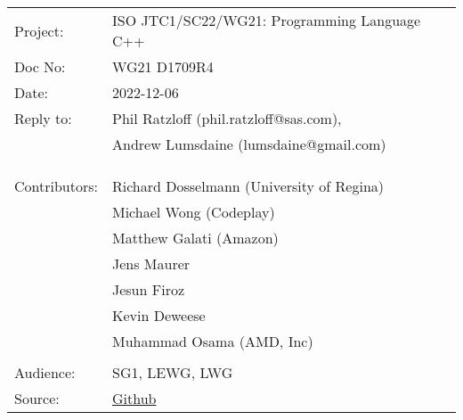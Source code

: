 \documentclass[10pt,oneside,openany,final]{memoir}
\begin{document}
\pagestyle{cpppage}


\begin{tabular}{@{}ll}
  Project:      & ISO JTC1/SC22/WG21: Programming Language C++           \\
  Doc No:       & WG21 D1709R4                                           \\
  Date:         & 2022-12-06                                             \\
  Reply to:     & Phil Ratzloff (phil.ratzloff@sas.com),                 \\
                & Andrew Lumsdaine (lumsdaine@gmail.com)                 \\
                &                                                        \\
                &                                                        \\
                &                                                        \\
  Contributors: & Richard Dosselmann (University of Regina)              \\
                & Michael Wong (Codeplay)                                \\
                & Matthew Galati (Amazon)                                \\
                & Jens Maurer                                            \\
                & Jesun Firoz                                            \\
                & Kevin Deweese                                          \\
                & Muhammad Osama (AMD, Inc)                              \\
                &                                                        \\
  Audience:     & SG1, LEWG, LWG                                         \\
  Source:       & \href{https://github.com/stdgraph/graph-v2}{Github}    \\
\end{tabular}
\end{document}
